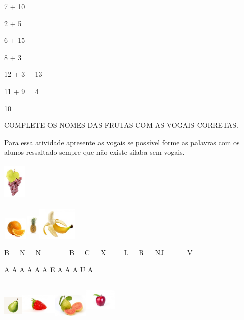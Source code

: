 {{7 + 10

2 + 5

6 + 15

8 + 3

12 + 3 + 13

11 + 9 = 4

\num{10}

COMPLETE OS NOMES DAS FRUTAS COM AS VOGAIS CORRETAS.

Para essa atividade apresente as vogais se possível forme as palavras
com os alunos ressaltado sempre que não existe sílaba sem vogais.

\includegraphics[width=0.42675in,height=0.72128in]{media/image69.jpeg}

\includegraphics[width=0.47708in,height=0.42778in]{media/image70.jpeg}\includegraphics[width=0.24167in,height=0.56597in]{media/image71.jpeg}\includegraphics[width=0.74522in,height=0.61494in]{media/image72.jpeg}

B\_\_N\_\_N \_\_ \_\_ B\_\_C\_\_X\_\_\_ L\_\_R\_\_NJ\_\_ \_\_V\_\_

A A A A A A E A A A U A

\includegraphics[width=0.37580in,height=0.49340in]{media/image73.jpeg}\includegraphics[width=0.67500in,height=0.56111in]{media/image74.jpeg}\includegraphics[width=0.64462in,height=0.50955in]{media/image75.jpeg}\includegraphics[width=0.58584in,height=0.73807in]{media/image76.jpeg}

}}
